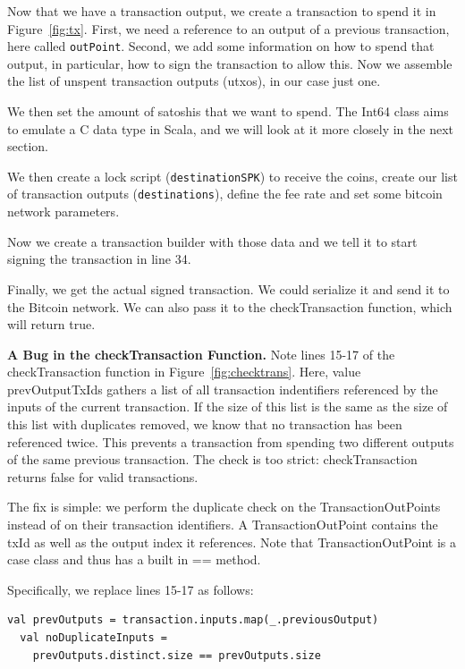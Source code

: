 \documentclass[runningheads]{llncs}
\renewcommand{\paragraph}{\textbf}%
\begin{document}
Now that we have a transaction output, we create a transaction to
spend it in Figure~\ref{fig:tx}. First, we need a reference to an
output of a previous transaction, here called
\texttt{outPoint}. Second, we add some information on how to spend
that output, in particular, how to sign the transaction to allow
this. Now we assemble the list of unspent transaction outputs (utxos),
in our case just one.

We then set the amount of satoshis that we want to spend. The Int64
class aims to emulate a C data type in Scala, and we will look at it
more closely in the next section.

We then create a lock script (\texttt{destinationSPK}) to receive the
coins, create our list of transaction outputs (\texttt{destinations}),
define the fee rate and set some bitcoin network parameters.

Now we create a transaction builder with those data and we tell it to
start signing the transaction in line 34.

Finally, we get the actual signed transaction. We could serialize it
and send it to the Bitcoin network. We can also pass it to the
checkTransaction function, which will return true.

\paragraph{A Bug in the checkTransaction Function.} Note lines 15-17
of the checkTransaction function in Figure~\ref{fig:checktrans}. Here,
value prevOutputTxIds gathers a list of all transaction indentifiers
referenced by the inputs of the current transaction. If the size of
this list is the same as the size of this list with duplicates
removed, we know that no transaction has been referenced twice. This
prevents a transaction from spending two different outputs of the same
previous transaction. The check is too strict: checkTransaction
returns false for valid transactions.

The fix is simple: we perform the duplicate check on the
TransactionOutPoints instead of on their transaction identifiers.  A
TransactionOutPoint contains the txId as well as the output index it
references. Note that TransactionOutPoint is a case class and thus has
a built in == method.

Specifically, we replace lines 15-17 as follows:
\begin{lstlisting}[style=scala, firstnumber=15]
  val prevOutputs = transaction.inputs.map(_.previousOutput)
  val noDuplicateInputs = 
    prevOutputs.distinct.size == prevOutputs.size
\end{lstlisting}
\end{document}
